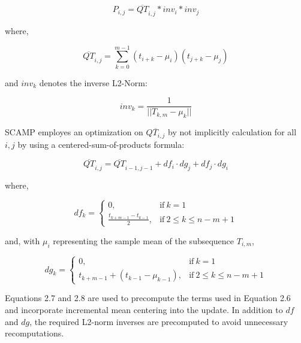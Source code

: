\begin{equation}
    P_{i,j} = \overline{QT}_{i,j} * inv_i * inv_j
\end{equation}

where,

\begin{equation}
    \overline{QT}_{i,j} = \sum_{k=0}^{m-1}{\left(t_{i+k} - \mu_i\right)\left(t_{j+k} - \mu_j\right)}
\end{equation}

and $inv_k$ denotes the inverse L2-Norm:

\begin{equation}
    inv_k = \frac{1}{||T_{k,m} - \mu_k||}
\end{equation}

SCAMP employes an optimization on $\overline{QT_{i,j}}$ by not implicitly calculation for all $i,j$ by using a centered-sum-of-products formula:

\begin{equation}
    \overline{QT}_{i,j} = \overline{QT}_{i-1,j-1} + df_i \cdot dg_j + df_j \cdot dg_i
\end{equation}

where,

\begin{equation}
    df_k =
    \begin{cases}
        0,                             & \text{if}\ k = 1                 \\
        \frac{t_{k+m-1} - t_{k-1}}{2}, & \text{if}\ 2 \le k \le n - m + 1
    \end{cases}
\end{equation}

and, with $\mu_i$ representing the sample mean of the subsequence $T_{i,m}$,


\begin{equation}
    dg_k =
    \begin{cases}
        0,                                              & \text{if}\ k = 1                 \\
        {t_{k+m-1} + \left(t_{k-1} - \mu_{k-1}\right)}, & \text{if}\ 2 \le k \le n - m + 1
    \end{cases}
\end{equation}

Equations 2.7 and 2.8 are used to precompute the terms used in Equation 2.6 and incorporate incremental mean centering into the update. In addition to $df$ and $dg$, the required L2-norm inverses are precomputed to avoid unnecessary recomputations.\\

